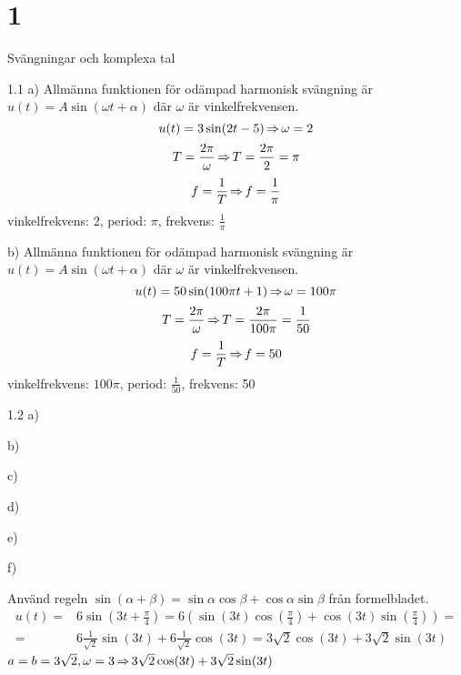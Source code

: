\chapter{1}{Svängningar och komplexa tal}
\begin{task}{1.1 a)}
Allmänna funktionen för odämpad harmonisk svängning är $u(t)=A\sin(\omega t + \alpha)$ där $\omega$ är vinkelfrekvensen.
\[u(t)=3\sin(2t-5) \operatorname{\Rightarrow} \omega=2\]
\[T=\frac{2\pi}{\omega} \operatorname{\Rightarrow} T = \frac{2\pi}{2} = \pi\]
\[f=\frac{1}{T} \operatorname{\Rightarrow} f = \frac{1}{\pi}\]
\ans vinkelfrekvens: 2, period: $\pi$, frekvens: $\frac{1}{\pi}$
\end{task}

\begin{task}{b)}
	Allmänna funktionen för odämpad harmonisk svängning är $u(t)=A\sin(\omega t + \alpha)$ där $\omega$ är vinkelfrekvensen.
	\[u(t)=50\sin(100\pi t+1) \operatorname{\Rightarrow} \omega=100\pi\]
	\[T=\frac{2\pi}{\omega} \operatorname{\Rightarrow} T = \frac{2\pi}{100\pi} = \frac{1}{50}\]
	\[f=\frac{1}{T} \operatorname{\Rightarrow} f = 50\]
	\ans vinkelfrekvens: $100\pi$, period: $\frac{1}{50}$, frekvens: 50
\end{task}

\begin{task}{1.2 a)}
\end{task}

\begin{task}{b)}
\end{task}

\begin{task}{c)}
\end{task}

\begin{task}{d)}
\end{task}

\begin{task}{e)}
\end{task}

\begin{task}{f)}
\end{task}

\begin{task}{1.3}
	Använd regeln $\sin(\alpha+\beta)=\sin\alpha\cos\beta+\cos\alpha\sin\beta$ från formelbladet.
	\begin{align*}
	u(t)= &
	6\sin(3t+\frac{\pi}{4})=
	6(\sin(3t)\cos(\frac{\pi}{4})+\cos(3t)\sin(\frac{\pi}{4}))= \\ =
	& 6\frac{1}{\sqrt{2}}\sin(3t)+6\frac{1}{\sqrt{2}}\cos(3t)=
	3\sqrt{2}\cos(3t)+3\sqrt{2}\sin(3t)
	\end{align*}
	\ans $a=b=3\sqrt{2}, \omega=3 \operatorname{\Rightarrow} 3\sqrt{2}\cos(3t)+3\sqrt{2}\sin(3t)$
\end{task}

